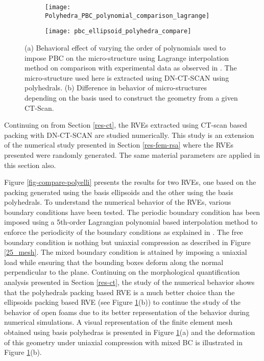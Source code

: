 \begin{figure}
	\centering
	\begin{subfigure}{0.49\textwidth}
		\texttt{[image: Polyhedra\_PBC\_polynomial\_comparison\_lagrange]}
		\caption{}
	\end{subfigure}
	\begin{subfigure}{0.49\textwidth}
		\texttt{[image: pbc\_ellipsoid\_polyhedra\_compare]}
		\caption{}
	\end{subfigure}
	\caption{(a) Behavioral effect of varying the order of polynomials used to impose PBC on the micro-structure using Lagrange interpolation method on comparison with experimental data as observed in \cite{jungMicrostructuralCharacterisationExperimental2017}. The micro-structure used here is extracted using DN-CT-SCAN using polyhedrals. (b) Difference in behavior of micro-structures depending on the basis used to construct the geometry from a given CT-Scan.}\label{fig-compare-pbc}
\end{figure}

Continuing on from Section \ref{res-ct}, the RVEs extracted using CT-scan based packing with DN-CT-SCAN are studied numerically. This study is an extension of the numerical study presented in Section \ref{res-fem-rsa} where the RVEs presented were randomly generated. The same material parameters are applied in this section also. 

Figure \ref{fig-compare-polyelli} presents the results for two RVEs, one based on the packing generated using the basis ellipsoids and the other using the basis polyhedrals. To understand the numerical behavior of the RVEs, various boundary conditions have been tested. The periodic boundary condition has been imposed using a 5th-order Lagrangian polynomial based interpolation method to enforce the periodicity of the boundary conditions as explained in \cite{nguyenImposingPeriodicBoundary2012}. The free boundary condition is nothing but uniaxial compression as described in Figure \ref{25_mesh}. The mixed boundary condition is attained by imposing a uniaxial load while ensuring that the bounding boxes deform along the normal perpendicular to the plane. Continuing on the morphological quantification analysis presented in Section \ref{res-ct}, the study of the numerical behavior shows that the polyhedrals packing based RVE is a much better choice than the ellipsoids packing based RVE (see Figure \ref{fig-compare-pbc}(b)) to continue the study of the behavior of open foams due to its better representation of the behavior during numerical simulations. A visual representation of the finite element mesh obtained using basis polyhedras is presented in Figure \ref{fig-compare-pbc}(a) and the deformation of this geometry under uniaxial compression with mixed BC is illustrated in Figure \ref{fig-compare-pbc}(b).

